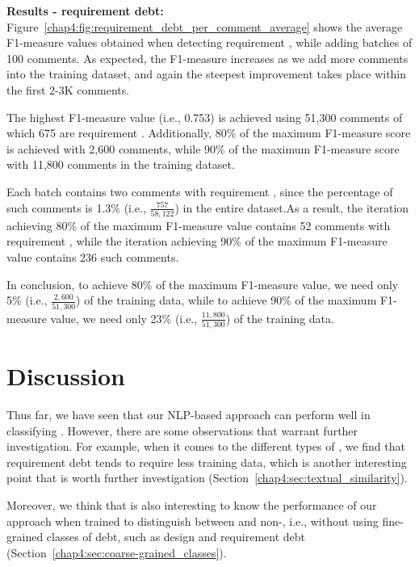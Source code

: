 \noindent \textbf{Results - requirement debt:} Figure~\ref{chap4:fig:requirement_debt_per_comment_average} shows the average F1-measure values obtained when detecting requirement \SATD, while adding batches of 100 comments. As expected, the F1-measure increases as we add more comments into the training dataset, and again the steepest improvement takes place within the first 2-3K comments.

The highest F1-measure value (i.e., 0.753) is achieved using 51,300 comments of which 675 are requirement \SATD. Additionally, 80\% of the maximum F1-measure score is achieved with 2,600 comments, while 90\% of the maximum F1-measure score with 11,800 comments in the training dataset.

Each batch contains two comments with requirement \SATD, since the percentage of such comments is 1.3\% (i.e., $\frac{757}{58,122}$) in the entire dataset.As a result, the iteration achieving 80\% of the maximum F1-measure value contains 52 comments with requirement \SATD, while the iteration achieving 90\% of the maximum F1-measure value contains 236 such comments.

In conclusion, to achieve 80\% of the maximum F1-measure value, we need only 5\% (i.e., $\frac{2,600}{51,300}$) of the training data, while to achieve 90\% of the maximum F1-measure value, we need only 23\% (i.e., $\frac{11,800}{51,300}$) of the training data.
  

\section{Discussion}
\label{chap4:sec:discussion}

Thus far, we have seen that our NLP-based approach can perform well in classifying \SATD. However, there are some observations that warrant further investigation. For example, when it comes to the different types of \SATD, we find that requirement debt tends to require less training data, which is another interesting point that is worth further investigation (Section~\ref{chap4:sec:textual_similarity}). 

Moreover, we think that is also interesting to know the performance of our approach when trained to distinguish between \SATD and non-\SATD, i.e., without using fine-grained classes of debt, such as design and requirement debt (Section~\ref{chap4:sec:coarse-grained_classes}).

